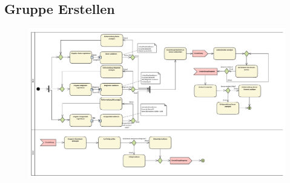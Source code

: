 \subsection*{Gruppe Erstellen}
\begin{figure}[h!]
	\centering
	\includegraphics[width=0.9\linewidth]{docs/3_Aktivitaetsdiagramme/Marius/GruppeErstellen.pdf}
	\label{fig:ActDia_Gruppe_Erstellen}
\end{figure}

\vfill
\pagebreak